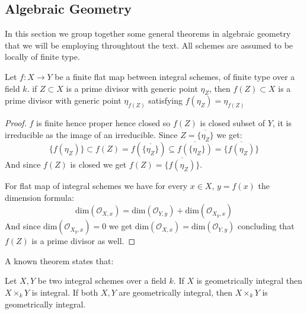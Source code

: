 \subsection{Algebraic Geometry}
In this section we group together some general theorems in algebraic geometry that we will be employing throughtout the text. 
All schemes are assumed to be locally of finite type. 
\begin{theorem}
    Let $f:X \to Y$ be a finite flat map between integral schemes, of finite type over a field $k$. if $Z \subset X$ is a prime divisor with generic point $\eta_Z$, then $f(Z) \subset X$
    is a prime divisor with generic point $\eta_{f(Z)}$ satisfying $f(\eta_Z)= \eta_{f(Z)}$
\end{theorem}
\begin{proof}
    $f$ is finite hence proper hence closed so $f(Z)$ is closed subset of $Y$, it is irreducible as the image of an irreducible.
    Since $Z = \overline{\{ \eta_Z \}}$ we get: 
    $$\{f(\eta_Z)\} \subset f(Z) = f(\overline{\{\eta_Z\}}) \subseteq \overline{f(\{\eta_Z\})} = \overline{\{f(\eta_Z)\}}$$
    And since $f(Z)$ is closed we get $f(Z) = \overline{\{f(\eta_Z)\}}$.

    For flat map of integral schemes we have for every $x \in X$, $y=f(x)$ the dimension formula:
    $$\text{dim}(\mathcal{O}_{X,x}) = \text{dim}(\mathcal{O}_{Y,y}) + \text{dim}(\mathcal{O}_{X_y, x})$$
    And since $\text{dim}(\mathcal{O}_{X_y, x}) = 0$ we get $\text{dim}(\mathcal{O}_{X,x}) = \text{dim}(\mathcal{O}_{Y,y})$
    concluding that $f(Z)$ is a prime divisor as well. 
\end{proof}

A known theorem states that: 
\begin{theorem}\label{theorem:int_geoint_implies_productint}
    Let $X, Y$ be two integral schemes over a field $k$. If $X$ is geometrically integral then $X \times_k Y$ 
    is integral.
    If both $X,Y$ are geometrically integral, then $X \times_k Y$ is geometrically integral. 
\end{theorem}

